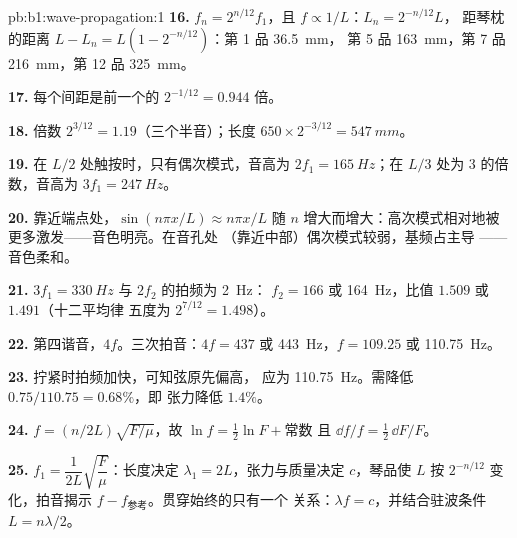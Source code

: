 \begin{solution}{pb:b1:wave-propagation:1}
\textbf{16.} $f_n = 2^{n/12}f_1$，且 $f \propto 1/L$：$L_n = 2^{-n/12}L$，
距琴枕的距离 $L - L_n = L(1 - 2^{-n/12})$：第 1 品 \qty{36.5}{mm}，
第 5 品 \qty{163}{mm}，第 7 品 \qty{216}{mm}，第 12 品 \qty{325}{mm}。

\textbf{17.} 每个间距是前一个的 $2^{-1/12} = 0.944$ 倍。

\textbf{18.} 倍数 $2^{3/12} = 1.19$（三个半音）；长度
$650 \times 2^{-3/12} = \qty{547}{mm}$。

\textbf{19.} 在 $L/2$ 处触按时，只有偶次模式，音高为 $2f_1 =
\qty{165}{Hz}$；在 $L/3$ 处为 $3$ 的倍数，音高为 $3f_1 = \qty{247}{Hz}$。

\textbf{20.} 靠近端点处，$\sin(n\pi x/L) \approx n\pi x/L$ 随
$n$ 增大而增大：高次模式相对地被更多激发——音色明亮。在音孔处
（靠近中部）偶次模式较弱，基频占主导
——音色柔和。

\textbf{21.} $3f_1 = \qty{330}{Hz}$ 与 $2f_2$ 的拍频为 \qty{2}{Hz}：
$f_2 = 166$ 或 \qty{164}{Hz}，比值 $1.509$ 或 $1.491$（十二平均律
五度为 $2^{7/12} = 1.498$）。

\textbf{22.} 第四谐音，$4f$。三次拍音：$4f = 437$ 或
\qty{443}{Hz}，$f = 109.25$ 或 \qty{110.75}{Hz}。

\textbf{23.} 拧紧时拍频加快，可知弦原先偏高，
应为 \qty{110.75}{Hz}。需降低 $0.75/110.75 = 0.68\%$，即
张力降低 $1.4\%$。

\textbf{24.} $f = (n/2L)\sqrt{F/\mu}$，故 $\ln f = \tfrac12\ln F + \text{常数}$
且 $\dd f/f = \tfrac12\,\dd F/F$。

\textbf{25.} $f_1 = \dfrac{1}{2L}\sqrt{\dfrac{F}{\mu}}$：长度决定
$\lambda_1 = 2L$，张力与质量决定 $c$，琴品使 $L$ 按
$2^{-n/12}$ 变化，拍音揭示 $f - f_{\text{参考}}$。贯穿始终的只有一个
关系：$\lambda f = c$，并结合驻波条件 $L = n\lambda/2$。
\end{solution}
